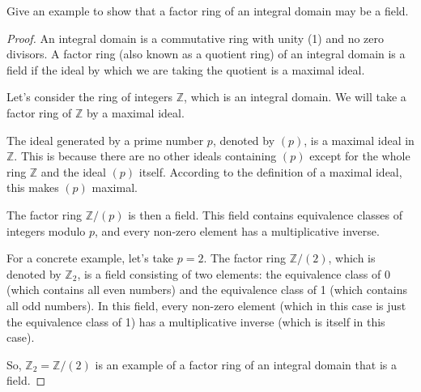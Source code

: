 \documentclass[12pt]{amsart}
\theoremstyle{definition}
\numberwithin{equation}{section}
\theoremstyle{plain}
\begin{document}
\begin{exercise}{12} Give an example to show that a factor ring of an integral domain may be a field.

    \begin{proof}
        An integral domain is a commutative ring with unity (1) and no zero divisors. A factor ring (also known as a quotient ring) of an integral domain is a field if the ideal by which we are taking the quotient is a maximal ideal.
    
    Let's consider the ring of integers \(\mathbb{Z}\), which is an integral domain. We will take a factor ring of \(\mathbb{Z}\) by a maximal ideal.
    
    The ideal generated by a prime number \(p\), denoted by \( (p) \), is a maximal ideal in \(\mathbb{Z}\). This is because there are no other ideals containing \( (p) \) except for the whole ring \(\mathbb{Z}\) and the ideal \( (p) \) itself. According to the definition of a maximal ideal, this makes \( (p) \) maximal.
    
    The factor ring \(\mathbb{Z}/(p)\) is then a field. This field contains equivalence classes of integers modulo \(p\), and every non-zero element has a multiplicative inverse.
    
    For a concrete example, let's take \(p = 2\). The factor ring \(\mathbb{Z}/(2)\), which is denoted by \(\mathbb{Z}_2\), is a field consisting of two elements: the equivalence class of 0 (which contains all even numbers) and the equivalence class of 1 (which contains all odd numbers). In this field, every non-zero element (which in this case is just the equivalence class of 1) has a multiplicative inverse (which is itself in this case).
    
    So, \(\mathbb{Z}_2 = \mathbb{Z}/(2)\) is an example of a factor ring of an integral domain that is a field.
    \end{proof}
\end{exercise}
\vspace*{20pt}
\end{document}
